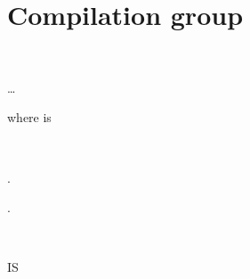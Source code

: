 \chapter{Compilation group}

\begin{syntax}
  \begin{0-1}
     \\
  \end{0-1} \ldots
\end{syntax}

where  is


\begin{syntax}
  \begin{0-1}
    \begin{1=}
       \\
    \end{1=}
    .
  \end{0-1} \newline
  .
  \begin{1=}
     \\
    \miscext{\literal}
  \end{1=}
  \begin{0-1}  \literal \end{0-1}
  \begin{0-1} IS
    \begin{1=}
      \begin{1+}
         \\

        \begin{1=}
           \\
        \end{1=}
      \end{1+} \\


\end{1=}
\end{0-1}
\end{syntax}
